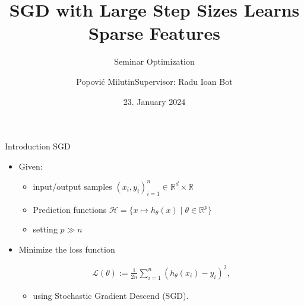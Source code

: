 \documentclass[fleqn]{beamer}
\title
{SGD with Large Step Sizes Learns Sparse Features}
\subtitle{Seminar Optimization}
\author[Popović Milutin]
{Popović Milutin\newline\newline Supervisor: Radu Ioan Bot}
\date{23. January 2024}
\begin{document}
    \begin{frame}
        \maketitle
    \end{frame}

    \begin{frame}{Introduction SGD}
        \begin{itemize}[<+->]
        \item[] Given:
            \begin{itemize}
                \item input/output samples $(x_i, y_i)_{i=1}^{n} \in
                    \mathbb{R}^{d} \times \mathbb{R}$
                \item Prediction functions
                    $\mathcal{H} = \{x \mapsto h_{\theta}(x)\; | \; \theta \in
                    \mathbb{R}^{p}\}$
                \item setting $p \gg n$
            \end{itemize}
        \item[] Minimize the loss function
        \begin{center}
            \begin{minipage}{0.5\textwidth}
                \begin{align*}
                    \mathcal{L}(\theta) := \frac{1}{2n} \sum_{i=1}^{n} \left(
                    h_\theta(x_i) - y_i \right)^{2},
                \end{align*}
            \end{minipage}
        \end{center}
        \begin{itemize}
            \item using Stochastic Gradient Descend (SGD).
        \end{itemize}

    \end{itemize}
    \end{frame}
\end{document}

